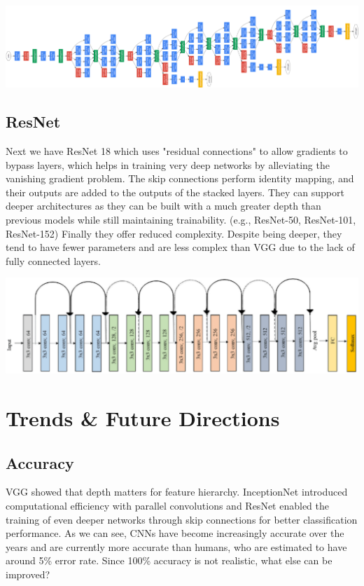 \documentclass{article}
\begin{document}
        \begin{center}
            \includegraphics[scale=0.35]{images/GoogleNet.png}
        \end{center}

    \subsection{ResNet}
        Next we have ResNet 18 which uses "residual connections" to allow gradients to bypass layers, which helps in training very deep networks by alleviating the vanishing gradient problem. The skip connections perform identity mapping, and their outputs are added to the outputs of the stacked layers. They can support deeper architectures as they can be built with a much greater depth than previous models while still maintaining trainability.  (e.g., ResNet-50, ResNet-101, ResNet-152) Finally they offer reduced complexity. Despite being deeper, they tend to have fewer parameters and are less complex than VGG due to the lack of fully connected layers.

        \begin{center}
            \includegraphics[scale=0.35]{images/ResNet.png}
        \end{center}

\section{Trends \& Future Directions}
    \subsection{Accuracy}
        VGG showed that depth matters for feature hierarchy. InceptionNet introduced computational efficiency with parallel convolutions and ResNet enabled the training of even deeper networks through skip connections for better classification performance. As we can see, CNNs have become increasingly accurate over the years and are currently more accurate than humans, who are estimated to have around 5\% error rate. Since 100\% accuracy is not realistic, what else can be improved?
    
\end{document}
